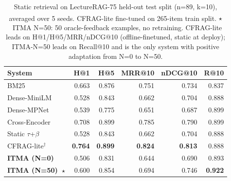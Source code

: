 \begin{table}[!htbp]
\centering
\small
\caption{Static retrieval on LectureRAG-75 held-out test split (n=89, k=10),
averaged over 5 seeds.
\textsuperscript{\textdagger}CFRAG-lite fine-tuned on 265-item train split.
$\star$~ITMA N=50: 50 oracle-feedback examples, no retraining.
CFRAG-lite leads on H@1/H@5/MRR/nDCG@10 (offline-finetuned, static at deploy);
ITMA-N=50 leads on Recall@10 and is the only system with positive
adaptation from N=0 to N=50.}
\label{tab:retrieval}
\begin{tabular}{lrrrrr}
\toprule
System & H@1 & H@5 & MRR@10 & nDCG@10 & R@10 \\
\midrule
BM25 & 0.663 & 0.876 & 0.751 & 0.734 & 0.837 \\
Dense-MiniLM & 0.528 & 0.843 & 0.662 & 0.704 & 0.888 \\
Dense-MPNet & 0.539 & 0.775 & 0.651 & 0.687 & 0.899 \\
Cross-Encoder & 0.708 & 0.899 & 0.785 & 0.790 & 0.899 \\
Static $\tau$+$\beta$ & 0.528 & 0.843 & 0.662 & 0.704 & 0.888 \\
CFRAG-lite$^\dagger$ & \textbf{0.764} & \textbf{0.899} & \textbf{0.824} & \textbf{0.813} & 0.888 \\
\midrule
\textbf{ITMA (N=0)} & 0.506 & 0.831 & 0.644 & 0.690 & 0.893 \\
\textbf{ITMA (N=50)~$\star$} & 0.600 & 0.854 & 0.694 & 0.746 & \textbf{0.922} \\
\bottomrule
\end{tabular}
\end{table}
